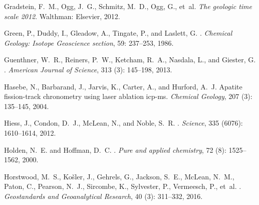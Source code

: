 \documentclass{article}
\begin{document}
\begin{thebibliography}{78}
Gradstein, F.~M., Ogg, J.~G., Schmitz, M.~D., Ogg, G., et~al.
\newblock \emph{The geologic time scale 2012}.
\newblock Walthman: Elsevier, 2012.

Green, P., Duddy, I., Gleadow, A., Tingate, P., and Laslett, G.
.
\newblock \emph{Chemical Geology: Isotope Geoscience section}, 59:
  237--253, 1986.

Guenthner, W.~R., Reiners, P.~W., Ketcham, R.~A., Nasdala, L., and Giester, G.
.
\newblock \emph{American Journal of Science}, 313 (3):
  145--198, 2013.

Hasebe, N., Barbarand, J., Jarvis, K., Carter, A., and Hurford, A.~J.
\newblock Apatite fission-track chronometry using laser ablation icp-ms.
\newblock \emph{Chemical Geology}, 207 (3): 135--145, 2004.

Hiess, J., Condon, D.~J., McLean, N., and Noble, S.~R.
.
\newblock \emph{Science}, 335 (6076): 1610--1614, 2012.

Holden, N.~E. and Hoffman, D.~C.
.
\newblock \emph{Pure and applied chemistry}, 72 (8):
  1525--1562, 2000.

Horstwood, M.~S., Ko{\v{s}}ler, J., Gehrels, G., Jackson, S.~E., McLean, N.~M.,
  Paton, C., Pearson, N.~J., Sircombe, K., Sylvester, P., Vermeesch, P., et~al.
.
\newblock \emph{Geostandards and Geoanalytical Research}, 40
  (3): 311--332, 2016.


\end{thebibliography}
\end{document}
